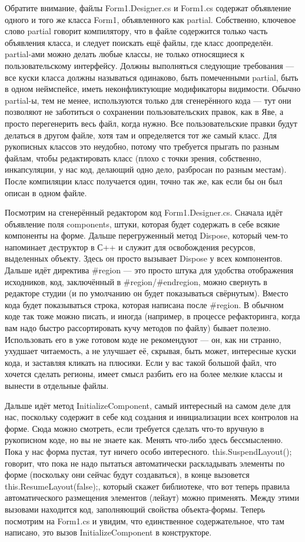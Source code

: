 \documentclass[a5paper]{article}
\begin{document}
Обратите внимание, файлы Form1.Designer.cs и Form1.cs содержат объявление одного и того же класса Form1, объявленного как partial. Собственно, ключевое слово partial говорит компилятору, что в файле содержится только часть объявления класса, и следует поискать ещё файлы, где класс доопределён. partial-ами можно делать любые классы, не только относящиеся к пользовательскому интерфейсу. Должны выполняться следующие требования --- все куски класса должны называться одинаково, быть помеченными partial, быть в одном неймспейсе, иметь неконфликтующие модификаторы видимости. Обычно partial-ы, тем не менее, используются только для сгенерённого кода --- тут они позволяют не заботиться о сохранении пользовательских правок, как в Яве, а просто перегенерить весь файл, когда нужно. Все пользовательские правки будут делаться в другом файле, хотя там и определяется тот же самый класс. Для рукописных классов это неудобно, потому что требуется прыгать по разным файлам, чтобы редактировать класс (плохо с точки зрения, собственно, инкапсуляции, у нас код, делающий одно дело, разбросан по разным местам). После компиляции класс получается один, точно так же, как если бы он был описан в одном файле.

Посмотрим на сгенерённый редактором код Form1.Designer.cs. Сначала идёт объявление поля components, штуки, которая будет содержать в себе всякие компоненты на форме. Дальше перегруженный метод Dispose, который чем-то напоминает деструктор в С++ и служит для освобождения ресурсов, выделенных объекту. Здесь он просто вызывает Dispose у всех компонентов. Дальше идёт директива \#region --- это просто штука для удобства отображения исходников, код, заключённый в \#region/\#endregion, можно свернуть в редакторе студии (и по умолчанию он будет показываться свёрнутым). Вместо кода будет показываться строка, которая написана после \#region. В обычном коде так тоже можно писать, и иногда (например, в процессе рефакторинга, когда вам надо быстро рассортировать кучу методов по файлу) бывает полезно. Использовать его в уже готовом коде не рекомендуют --- он, как ни странно, ухудшает читаемость, а не улучшает её, скрывая, быть может, интересные куски кода, и заставляя кликать на плюсики. Если у вас такой большой файл, что хочется сделать регионы, имеет смысл разбить его на более мелкие классы и вынести в отдельные файлы.

Дальше идёт метод InitializeComponent, самый интересный на самом деле для нас, поскольку содержит в себе код создания и инициализации всех контролов на форме. Сюда можно смотреть, если требуется сделать что-то вручную в рукописном коде, но вы не знаете как. Менять что-либо здесь бессмысленно. Пока у нас форма пустая, тут ничего особо интересного. this.SuspendLayout(); говорит, что пока не надо пытаться автоматически раскладывать элементы по форме (поскольку они сейчас будут создаваться), в конце вызовется this.ResumeLayout(false);, который скажет библиотеке, что вот теперь правила автоматического размещения элементов (лейаут) можно применять. Между этими вызовами находится код, заполняющий свойства объекта-формы. Теперь посмотрим на Form1.cs и увидим, что единственное содержательное, что там написано, это вызов InitializeComponent в конструкторе. 
\end{document}
